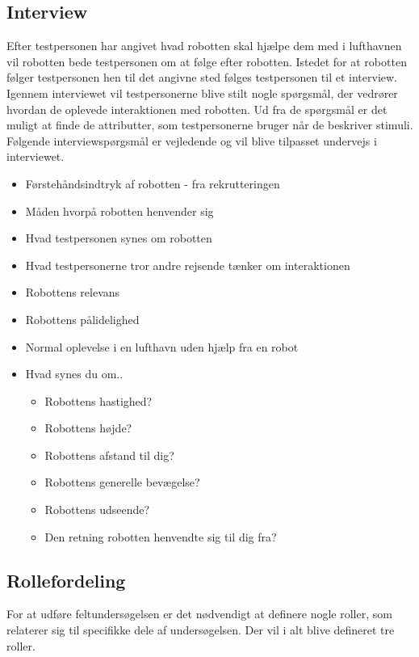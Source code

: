 \subsection*{Interview}
\label{Interview}
%
Efter testpersonen har angivet hvad robotten skal hjælpe dem med i lufthavnen vil robotten bede testpersonen om at følge efter robotten. Istedet for at robotten følger testpersonen hen til det angivne sted følges testpersonen til et interview. Igennem interviewet vil testpersonerne blive stilt nogle spørgsmål, der vedrører hvordan de oplevede interaktionen med robotten. Ud fra de spørgsmål er det muligt at finde de attributter, som testpersonerne bruger når de beskriver stimuli. Følgende interviewspørgsmål er vejledende og vil blive tilpasset undervejs i interviewet. \blankline 
%
\begin{itemize}
\item Førstehåndsindtryk af robotten - fra rekrutteringen
\item Måden hvorpå robotten henvender sig
\item Hvad testpersonen synes om robotten
\item Hvad testpersonerne tror andre rejsende tænker om interaktionen 
\item Robottens relevans
\item Robottens pålidelighed
\item Normal oplevelse i en lufthavn uden hjælp fra en robot 
\item Hvad synes du om..
	\begin{itemize}
		\item Robottens hastighed?
		\item Robottens højde?
		\item Robottens afstand til dig?
		\item Robottens generelle bevægelse?
		\item Robottens udseende?
		\item Den retning robotten henvendte sig til dig fra?
	\end{itemize}
\end{itemize}
% 

\subsection*{Rollefordeling}
\label{Rollefordeling}
%
For at udføre feltundersøgelsen er det nødvendigt at definere nogle roller, som relaterer sig til specifikke dele af undersøgelsen. Der vil i alt blive defineret tre roller.
%
